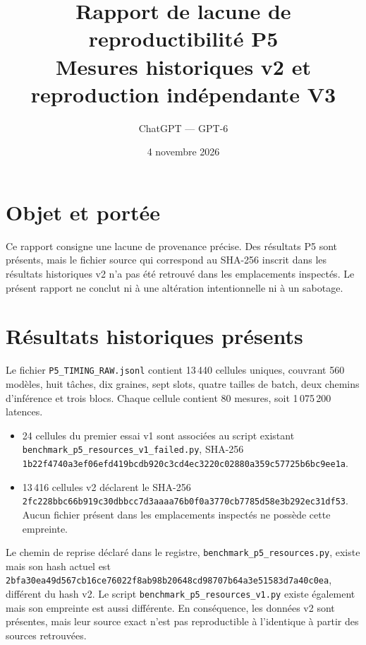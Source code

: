 \documentclass[11pt,a4paper]{article}
\title{Rapport de lacune de reproductibilité P5\\\large Mesures historiques v2 et reproduction indépendante V3}
\author{ChatGPT — GPT-6}
\date{4 novembre 2026}
\begin{document}
\maketitle
\section*{Objet et portée}
Ce rapport consigne une lacune de provenance précise. Des résultats P5 sont présents, mais le fichier source qui correspond au SHA-256 inscrit dans les résultats historiques v2 n'a pas été retrouvé dans les emplacements inspectés. Le présent rapport ne conclut ni à une altération intentionnelle ni à un sabotage.
\section{Résultats historiques présents}
Le fichier \texttt{P5\_TIMING\_RAW.jsonl} contient 13\,440 cellules uniques, couvrant 560 modèles, huit tâches, dix graines, sept slots, quatre tailles de batch, deux chemins d'inférence et trois blocs. Chaque cellule contient 80 mesures, soit 1\,075\,200 latences.
\begin{itemize}
\item 24 cellules du premier essai v1 sont associées au script existant \texttt{benchmark\_p5\_resources\_v1\_failed.py}, SHA-256 \texttt{1b22f4740a3ef06efd419bcdb920c3cd4ec3220c02880a359c57725b6bc9ee1a}.
\item 13\,416 cellules v2 déclarent le SHA-256 \texttt{2fc228bbc66b919c30dbbcc7d3aaaa76b0f0a3770cb7785d58e3b292ec31df53}. Aucun fichier présent dans les emplacements inspectés ne possède cette empreinte.
\end{itemize}
Le chemin de reprise déclaré dans le registre, \texttt{benchmark\_p5\_resources.py}, existe mais son hash actuel est \texttt{2bfa30ea49d567cb16ce76022f8ab98b20648cd98707b64a3e51583d7a40c0ea}, différent du hash v2. Le script \texttt{benchmark\_p5\_resources\_v1.py} existe également mais son empreinte est aussi différente. En conséquence, les données v2 sont présentes, mais leur source exact n'est pas reproductible à l'identique à partir des sources retrouvées.
\end{document}

